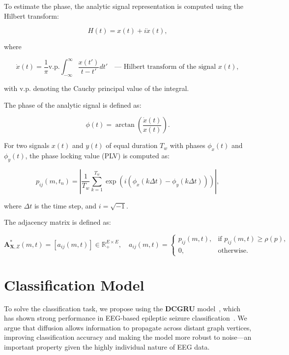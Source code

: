 \documentclass[12pt, twoside]{article}
\begin{document}
To estimate the phase, the analytic signal representation is computed using the Hilbert transform:

\begin{equation}
H(t) = x(t) + i\dot{x}(t),
\end{equation}

where

\begin{equation}
\dot{x}(t) = \frac{1}{\pi} \text{v.p.} \int_{-\infty}^{\infty} \frac{x(t')}{t - t'} dt' \quad \text{— Hilbert transform of the signal } x(t),
\end{equation}

\noindent with v.p. denoting the Cauchy principal value of the integral.

The phase of the analytic signal is defined as:

\begin{equation}
\phi(t) = \arctan \left( \frac{\dot{x}(t)}{x(t)} \right).
\end{equation}

For two signals $x(t)$ and $y(t)$ of equal duration $T_w$ with phases $\phi_x(t)$ and $\phi_y(t)$, the phase locking value (PLV) \cite{9} is computed as:

\begin{equation}
p_{ij}(m, t_n) = \left| \frac{1}{T_w} \sum_{k=1}^{T_w} \exp \left( i(\phi_x(k \Delta t) - \phi_y(k \Delta t)) \right) \right|,
\end{equation}

where $\Delta t$ is the time step, and $i = \sqrt{-1}$.

The adjacency matrix is defined as:

\begin{equation}
\mathbf{A}_{\mathbf{X}, Z}^*(m, t) = [a_{ij}(m, t)] \in \mathbb{R}_+^{E \times E}, \quad a_{ij}(m, t) = 
\begin{cases} 
p_{ij}(m, t), & \text{if } p_{ij}(m, t) \geq \rho(p), \\
0, & \text{otherwise}.
\end{cases}
\end{equation}

\section{Classification Model}

To solve the classification task, we propose using the \textbf{DCGRU} model~\cite{DCRNN}, which has shown strong performance in EEG-based epileptic seizure classification~\cite{DCGRU}. We argue that diffusion allows information to propagate across distant graph vertices, improving classification accuracy and making the model more robust to noise—an important property given the highly individual nature of EEG data.
\end{document}
